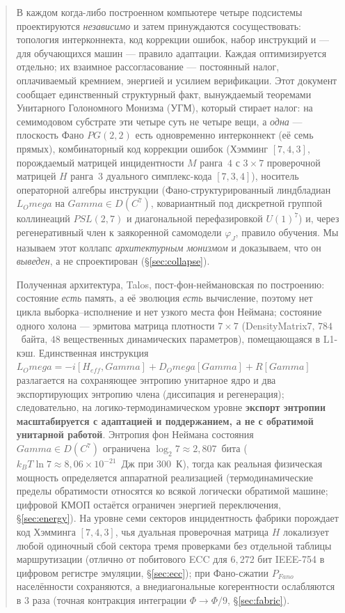 \documentclass[10pt,letterpaper]{article}
\theoremstyle{talos}
\newcommand{\Gam}{\ensuremath{\Gamma}}
\newcommand{\Dens}{\ensuremath{\mathcal{D}}}
\newcommand{\Lind}{\ensuremath{\mathcal{L}}}
\newcommand{\LindOmega}{\ensuremath{\Lind_\Omega}}
\newcommand{\Regen}{\ensuremath{\mathcal{R}}}
\newcommand{\Diss}{\ensuremath{\mathcal{D}_\Omega}}
\newcommand{\Fano}{\ensuremath{\mathrm{PG}(2,2)}}
\newcommand{\DM}{\textsc{DensityMatrix7}\xspace}
\newcommand{\TALOS}{\textsc{Talos}\xspace}
\def\Gam{Gamma}\def\Dens{D}\def\Lind{L}\def\LindOmega{L_Omega}\def\Regen{R}\def\Diss{D_Omega}%
\def\mathrm#1{#1}\def\mathbb#1{#1}\def\mathcal#1{#1}\def\mathbf#1{#1}\def\mathfrak#1{#1}\def\textsc#1{#1}%
\begin{document}
\begin{abstract}
\noindent
В каждом когда-либо построенном компьютере четыре подсистемы проектируются
\emph{независимо} и затем принуждаются сосуществовать: топология
интерконнекта, код коррекции ошибок, набор инструкций и --- для обучающихся
машин --- правило адаптации. Каждая оптимизируется отдельно; их взаимное
рассогласование --- постоянный налог, оплачиваемый кремнием, энергией и
усилием верификации. Этот документ сообщает единственный структурный факт,
вынуждаемый теоремами Унитарного Голономного Монизма (УГМ), который стирает
налог: на семимодовом субстрате эти четыре суть не четыре вещи, а
\emph{одна} --- плоскость Фано $\Fano$ есть одновременно интерконнект (её семь
прямых), комбинаторный код коррекции ошибок (Хэмминг $[7,4,3]$, порождаемый
матрицей инцидентности $M$ ранга~$4$ с $3\times 7$ проверочной матрицей $H$
ранга~$3$ дуального симплекс-кода $[7,3,4]$), носитель операторной алгебры
инструкции (Фано-структурированный линдбладиан $\LindOmega$ на
$\Gam\in\Dens(\mathbb{C}^7)$, ковариантный под дискретной группой коллинеаций
$\mathrm{PSL}(2,7)$ и диагональной перефазировкой $U(1)^7$) и, через
регенеративный член к заякоренной самомодели $\varphi_J$, правило обучения. Мы
называем этот коллапс \emph{архитектурным монизмом} и доказываем, что он
\emph{выведен}, а не спроектирован (\S\ref{sec:collapse}).

Полученная архитектура, \TALOS{}, пост-фон-неймановская по построению:
состояние \emph{есть} память, а её эволюция \emph{есть} вычисление, поэтому нет
цикла выборка--исполнение и нет узкого места фон Неймана; состояние одного
холона --- эрмитова матрица плотности $7\times7$ (\DM{}, $784$~байта, $48$
вещественных динамических параметров), помещающаяся в L1-кэш. Единственная
инструкция $\LindOmega = -i[H_{\mathrm{eff}},\Gam] + \Diss[\Gam] +
\Regen[\Gam]$ разлагается на сохраняющее энтропию унитарное ядро и два
экспортирующих энтропию члена (диссипация и регенерация); следовательно, на
логико-термодинамическом уровне \textbf{экспорт энтропии масштабируется с
адаптацией и поддержанием, а не с обратимой унитарной работой}. Энтропия фон
Неймана состояния $\Gam\in\Dens(\mathbb{C}^7)$ ограничена $\log_2 7\approx
2{,}807$~бита ($k_BT\ln 7\approx 8{,}06\times10^{-21}$~Дж при $300$~К), тогда
как реальная физическая мощность определяется аппаратной реализацией
(термодинамические пределы обратимости относятся ко всякой логически обратимой
машине; цифровой КМОП остаётся ограничен энергией переключения,
\S\ref{sec:energy}). На уровне семи секторов инцидентность фабрики порождает
код Хэмминга $[7,4,3]$, чья дуальная проверочная матрица $H$ локализует любой
одиночный сбой сектора тремя проверками без отдельной таблицы маршрутизации
(отлично от побитового ECC для $6{,}272$ бит IEEE-754 в цифровом регистре
эмуляции, \S\ref{sec:ecc}); при Фано-сжатии $\mathcal{P}_{\mathrm{Fano}}$
населённости сохраняются, а внедиагональные когерентности ослабляются в $3$ раза
(точная контракция интеграции $\Phi\to\Phi/9$, \S\ref{sec:fabric}).


\end{abstract}
\end{document}

